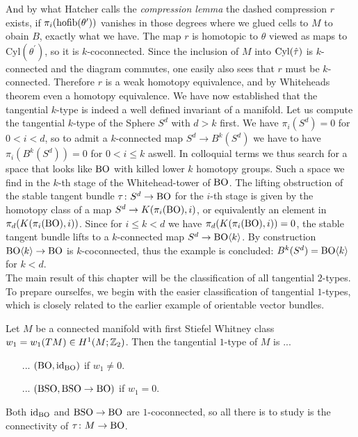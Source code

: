 And by what Hatcher calls the \emph{compression lemma} the dashed compression $r$ exists, if $\pi_i(\operatorname{hofib}(\theta^\prime))$ vanishes in those degrees where we glued cells to $M$ to obain $B$, exactly what we have.
The map $r$ is homotopic to $\theta$ viewed as maps to $\mathrm{Cyl}(\theta^\prime)$, so it is $k$-coconnected.
Since the inclusion of $M$ into $\mathrm{Cyl}(\hat{\tau})$ is $k$-connected and the diagram commutes, one easily also sees that $r$ must be $k$-connected.
Therefore $r$ is a weak homotopy equivalence, and by Whiteheads theorem even a homotopy equivalence.
\endprf
We have now established that the tangential $k$-type is indeed a well defined invariant of a manifold.
Let us compute the tangential $k$-type of the Sphere $S^d$ with $d>k$ first.
We have $\pi_i(S^d) = 0$ for $0<i<d$, so to admit a $k$-connected map $S^d \to B^k(S^d)$ we have to have $\pi_i(B^k(S^d)) = 0$ for $0<i\leq k$ aswell.
In colloquial terms we thus search for a space that looks like $\mathrm{BO}$ with killed lower $k$ homotopy groups. 
Such a space we find in the $k$-th stage of the Whitehead-tower of $\mathrm{BO}$. 
The lifting obstruction of the stable tangent bundle $\tau\colon S^d \to \mathrm{BO}$ for the $i$-th stage is given by the homotopy class of a map $S^d \to K(\pi_i(\mathrm{BO}),i)$, or equivalently an element in $\pi_d(K(\pi_i(\mathrm{BO}),i))$.
Since for $i\leq k <d$ we have $\pi_d(K(\pi_i(\mathrm{BO}),i))= 0$, the stable tangent bundle lifts to a $k$-connected map $S^d\to \mathrm{BO}\langle k \rangle$.
By construction $\mathrm{BO}\langle k \rangle \to \mathrm{BO}$ is $k$-coconnected, thus the example is concluded: $B^k(S^d) = \mathrm{BO}\langle k\rangle$ for $k<d$.\\
The main result of this chapter will be the classification of all tangential $2$-types. 
To prepare ourselfes, we begin with the easier classification of tangential $1$-types, which is closely related to the earlier example of orientable vector bundles.
\begin{thesisprop}
    Let $M$ be a connected manifold with first Stiefel Whitney class $w_1 = w_1(TM)\in H^1(M;\mathbb{Z}_2)$. Then the tangential $1$-type of $M$ is ...
    \begin{itemize}[noitemsep]
        \item[...] $(\mathrm{BO},\operatorname{id}_{\mathrm{BO}})$ if $w_1 \neq 0$.
        \item[...] $(\mathrm{BSO}, \mathrm{BSO} \to \mathrm{BO})$ if $w_1 = 0$.
    \end{itemize}
\end{thesisprop}
\prf
    Both $\operatorname{id}_{\mathrm{BO}}$ and $\mathrm{BSO}\to\mathrm{BO}$ are $1$-coconnected, so all there is to study is the connectivity of $\tau\colon M\to \mathrm{BO}$.
